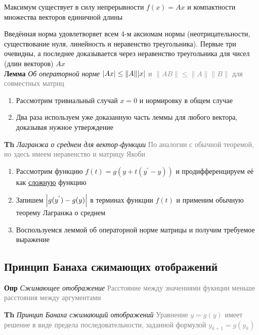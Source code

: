 Максимум существует в силу непрерывности $f(x) = Ax$ и компактности множества векторов единичной длины

Введённая норма удовлетворяет всем 4-м аксиомам нормы (неотрицательности, существование нуля, линейность и
неравенство треугольника).
Первые три очевидны, а последнее доказывается через неравенство треугольника для чисел (длин векторов) $Ax$ \\

\textbf{Лемма} \textit{Об операторной норме}
\textcolor{gray}{$\abs{Ax} \leq \|A\| \abs{x}$ и $\|AB\| \leq \|A\| \|B\|$ для совместных матриц}

\begin{enumerate}
    \item Рассмотрим тривиальный случай $x = 0$ и нормировку в общем случае
    \item Два раза используем уже доказанную часть леммы для любого вектора, доказывая нужное утверждение
\end{enumerate}

\textbf{Th} \textit{Лагранжа о среднем для вектор-функции}
\textcolor{gray}{По аналогии с обычной теоремой, но здесь имеем неравенство и матрицу Якоби}

\begin{enumerate}
    \item Рассмотрим функцию $f(t) = g(y + t(y^{'} - y))$ и продифференцируем её как \underline{сложную} функцию
    \item Запишем $\abs{g(y^{'}) - g(y)}$ в терминах функции $f(t)$ и применим обычную теорему Лагранжа о среднем
    \item Воспользуемся леммой об операторной норме матрицы и получим требуемое выражение
\end{enumerate}

\subsection{Принцип Банаха сжимающих отображений}

\textbf{Опр} \textit{Сжимающее отображение}
\textcolor{gray}{Расстояние между значениями фукнции меньше расстояния между аргументами}

\textbf{Th} \textit{Принцип Банаха сжимающий отображений}
\textcolor{gray}{Уравнение $y = g(y)$ имеет решение в виде предела последовательности, заданной формулой $y_{k+1} = g
(y_k)$}


